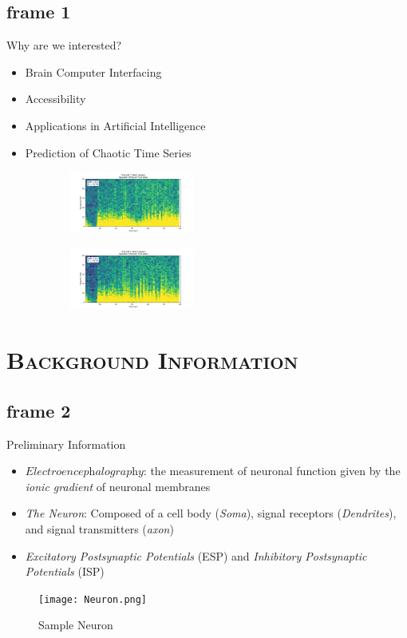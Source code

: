 \documentclass[xcolor=x11names,compress]{beamer}
\renewcommand{\(}{\begin{columns}}
\renewcommand{\)}{\end{columns}}
\newcommand{\<}[1]{\begin{column}{#1}}
\renewcommand{\>}{\end{column}}
\begin{document}
\subsection{frame 1}
\begin{frame}{Why are we interested?}
\begin{itemize}
\item Brain Computer Interfacing
\item Accessibility
\item Applications in Artificial Intelligence
\item Prediction of Chaotic Time Series
\end{itemize}
\begin{figure}
\centering
\begin{subfigure}[b]{0.3\textwidth}%
{\includegraphics[width=1.6in]{Channel_1_Spec_Blink_Test.png}}
\end{subfigure}
\hspace{10mm}
\begin{subfigure}[b]{0.3\textwidth}%
{\includegraphics[width=1.6in]{Channel_2_Spec_Blink_Test.png}}
\end{subfigure}
\hspace{2mm}
\end{figure}
\end{frame}

\section{\scshape Background Information}
\subsection{frame 2}
\begin{frame}{Preliminary Information}
  \begin{itemize}
  \item
    $\textit{Electroencephalography}$: the measurement of neuronal function given by the \textit{ionic gradient} of neuronal membranes
  \item
    \textit{The Neuron}: Composed of a cell body (\textit{Soma}), signal receptors (\textit{Dendrites}), and signal transmitters (\textit{axon})
  \item
    \textit{Excitatory Postsynaptic Potentials} (ESP) and \textit{Inhibitory Postsynaptic Potentials} (ISP)
  \end{itemize}
  \begin{figure}[h]
    \centering
    \texttt{[image: Neuron.png]}
    \caption{Sample Neuron}
    \label{fig:neuron}
   \end{figure}
\end{frame}
\end{document}
